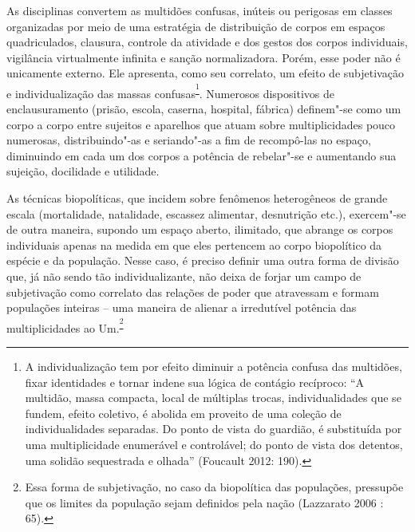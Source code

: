 As disciplinas convertem as multidões confusas, inúteis ou perigosas em
classes organizadas por meio de uma estratégia de distribuição de corpos
em espaços quadriculados, clausura, controle da atividade e dos gestos
dos corpos individuais, vigilância virtualmente infinita e sanção
normalizadora. Porém, esse poder não é unicamente externo. Ele
apresenta, como seu correlato, um efeito de subjetivação e
individualização das massas confusas\textsuperscript{\footnote{A
  individualização tem por efeito diminuir a potência confusa das
  multidões, fixar identidades e tornar indene sua lógica de contágio
  recíproco: ``A multidão, massa compacta, local de múltiplas trocas,
  individualidades que se fundem, efeito coletivo, é abolida em proveito
  de uma coleção de individualidades separadas. Do ponto de vista do
  guardião, é substituída por uma multiplicidade enumerável e
  controlável; do ponto de vista dos detentos, uma solidão sequestrada e
  olhada'' (Foucault 2012: 190).}}. Numerosos dispositivos de
enclausuramento (prisão, escola, caserna, hospital, fábrica) definem"-se
como um corpo a corpo entre sujeitos e aparelhos que atuam sobre
multiplicidades pouco numerosas, distribuindo"-as e seriando"-as a fim de
recompô-las no espaço, diminuindo em cada um dos corpos a potência de
rebelar"-se e aumentando sua sujeição, docilidade e utilidade.

As técnicas biopolíticas, que incidem sobre fenômenos heterogêneos de
grande escala (mortalidade, natalidade, escassez alimentar, desnutrição
etc.), exercem"-se de outra maneira, supondo um espaço aberto, ilimitado,
que abrange os corpos individuais apenas na medida em que eles pertencem
ao corpo biopolítico da espécie e da população. Nesse caso, é preciso
definir uma outra forma de divisão que, já não sendo tão
individualizante, não deixa de forjar um campo de subjetivação como
correlato das relações de poder que atravessam e formam populações
inteiras -- uma maneira de alienar a irredutível potência das
multiplicidades ao Um.\textsuperscript{\footnote{Essa forma de
  subjetivação, no caso da biopolítica das populações, pressupõe que os
  limites da população sejam definidos pela nação (Lazzarato 2006 : 65).}}

